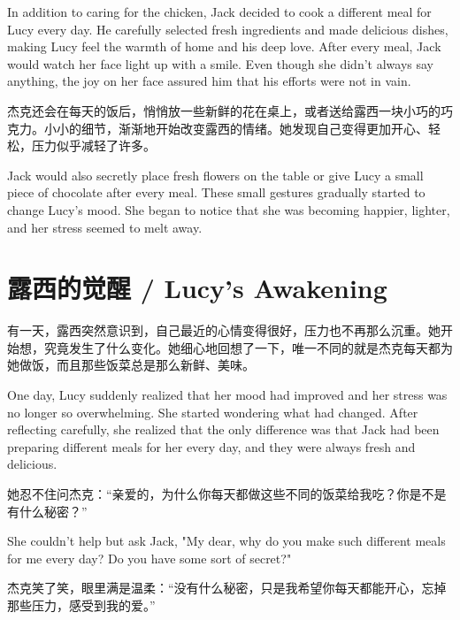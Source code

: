 \begin{flushright}
In addition to caring for the chicken, Jack decided to cook a different meal for Lucy every day. He carefully selected fresh ingredients and made delicious dishes, making Lucy feel the warmth of home and his deep love. After every meal, Jack would watch her face light up with a smile. Even though she didn’t always say anything, the joy on her face assured him that his efforts were not in vain.
\end{flushright}

杰克还会在每天的饭后，悄悄放一些新鲜的花在桌上，或者送给露西一块小巧的巧克力。小小的细节，渐渐地开始改变露西的情绪。她发现自己变得更加开心、轻松，压力似乎减轻了许多。

\begin{flushright}
Jack would also secretly place fresh flowers on the table or give Lucy a small piece of chocolate after every meal. These small gestures gradually started to change Lucy's mood. She began to notice that she was becoming happier, lighter, and her stress seemed to melt away.
\end{flushright}

\section*{露西的觉醒 / Lucy’s Awakening}

有一天，露西突然意识到，自己最近的心情变得很好，压力也不再那么沉重。她开始想，究竟发生了什么变化。她细心地回想了一下，唯一不同的就是杰克每天都为她做饭，而且那些饭菜总是那么新鲜、美味。

\begin{flushright}
One day, Lucy suddenly realized that her mood had improved and her stress was no longer so overwhelming. She started wondering what had changed. After reflecting carefully, she realized that the only difference was that Jack had been preparing different meals for her every day, and they were always fresh and delicious.
\end{flushright}

她忍不住问杰克：“亲爱的，为什么你每天都做这些不同的饭菜给我吃？你是不是有什么秘密？”

\begin{flushright}
She couldn't help but ask Jack, "My dear, why do you make such different meals for me every day? Do you have some sort of secret?"
\end{flushright}

杰克笑了笑，眼里满是温柔：“没有什么秘密，只是我希望你每天都能开心，忘掉那些压力，感受到我的爱。”

